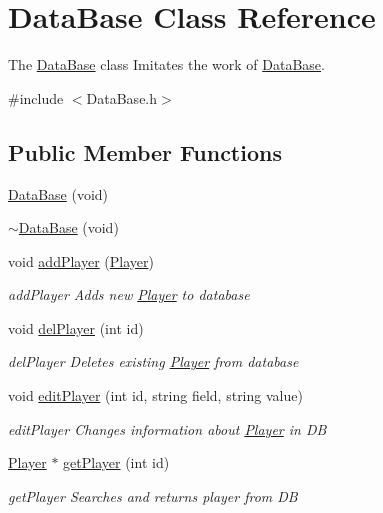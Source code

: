 \hypertarget{class_data_base}{\section{Data\-Base Class Reference}
\label{class_data_base}
}


The \hyperlink{class_data_base}{Data\-Base} class Imitates the work of \hyperlink{class_data_base}{Data\-Base}.  




{\ttfamily \#include $<$Data\-Base.\-h$>$}

\subsection*{Public Member Functions}
\begin{DoxyCompactItemize}
\item 
\hyperlink{class_data_base_a0b3291241e49d9b9634b3de61678a477}{Data\-Base} (void)
\item 
\hyperlink{class_data_base_adf40fe9249bbce059d5f2cd2258e7d6f}{$\sim$\-Data\-Base} (void)
\item 
void \hyperlink{class_data_base_adb4b3e45b6999bd0dffda26a11beb4f9}{add\-Player} (\hyperlink{class_player}{Player})
\begin{DoxyCompactList}\small\item\em add\-Player Adds new \hyperlink{class_player}{Player} to database \end{DoxyCompactList}\item 
void \hyperlink{class_data_base_a9a11414e2bdb19b83e4c809a8d7d9ea2}{del\-Player} (int id)
\begin{DoxyCompactList}\small\item\em del\-Player Deletes existing \hyperlink{class_player}{Player} from database \end{DoxyCompactList}\item 
void \hyperlink{class_data_base_a1a4731ade06cc1a3db9d8fdc922bb2de}{edit\-Player} (int id, string field, string value)
\begin{DoxyCompactList}\small\item\em edit\-Player Changes information about \hyperlink{class_player}{Player} in D\-B \end{DoxyCompactList}\item 
\hyperlink{class_player}{Player} $\ast$ \hyperlink{class_data_base_a03fed8ac60602990cf664a909a264a2a}{get\-Player} (int id)
\begin{DoxyCompactList}\small\item\em get\-Player Searches and returns player from D\-B \end{DoxyCompactList}\item 

\end{DoxyCompactItemize}
